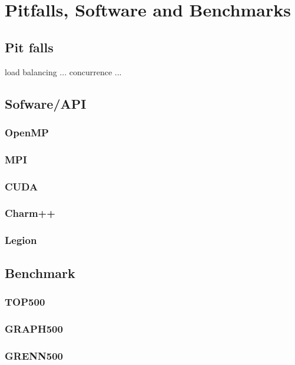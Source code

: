 
\chapter{Pitfalls, Software and Benchmarks}

\section{Pit falls}

load balancing ... 
concurrence ... 

\section{Sofware/API}
\subsection{OpenMP}
\subsection{MPI}
\subsection{CUDA}
\subsection{Charm++}
\subsection{Legion}
\section{Benchmark}
\subsection{TOP500}
\subsection{GRAPH500}
\subsection{GRENN500}